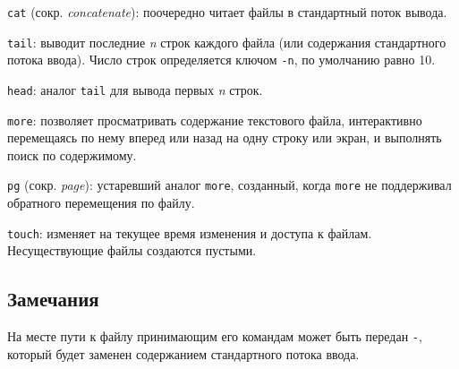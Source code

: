 \documentclass[listings]{labreport}
\begin{document}
\texttt{cat} (сокр. \textit{concatenate}): поочередно читает файлы в стандартный поток вывода.

\texttt{tail}: выводит последние \textit{n} строк каждого файла (или содержания стандартного потока ввода).
Число строк определяется ключом \texttt{-n}, по умолчанию равно 10.

\texttt{head}: аналог \texttt{tail} для вывода первых \textit{n} строк.

\texttt{more}: позволяет просматривать содержание текстового файла, интерактивно перемещаясь по нему вперед
или назад на одну строку или экран, и выполнять поиск по содержимому.

\texttt{pg} (сокр. \textit{page}): устаревший аналог \texttt{more}, созданный, когда \texttt{more} не поддерживал
обратного перемещения по файлу.

\texttt{touch}: изменяет на текущее время изменения и доступа к файлам. Несуществующие файлы создаются пустыми.

\subsection*{Замечания}

На месте пути к файлу принимающим его командам может быть передан \texttt{-}, который будет заменен
содержанием стандартного потока ввода.
\end{document}

